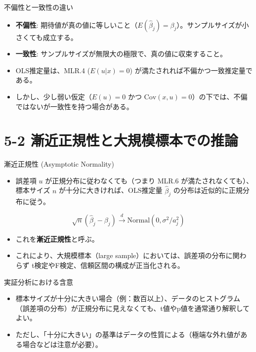 \documentclass[
  ignorenonframetext,
]{beamer}
\providecommand{\tightlist}{%
  \setlength{\itemsep}{0pt}\setlength{\parskip}{0pt}}
\begin{document}
\begin{frame}{不偏性と一致性の違い}
\protect\hypertarget{ux4e0dux504fux6027ux3068ux4e00ux81f4ux6027ux306eux9055ux3044}{}
\begin{itemize}
\tightlist
\item
  \textbf{不偏性}:
  期待値が真の値に等しいこと（\(E(\hat{\beta}_j) = \beta_j\)）。サンプルサイズが小さくても成立する。
\item
  \textbf{一致性}:
  サンプルサイズが無限大の極限で、真の値に収束すること。
\item
  OLS推定量は、MLR.4 (\(E(u|x)=0\))
  が満たされれば不偏かつ一致推定量である。
\item
  しかし、少し弱い仮定（\(E(u)=0\) かつ
  \(\text{Cov}(x,u)=0\)）の下では、不偏ではないが一致性を持つ場合がある。
\end{itemize}
\end{frame}

\hypertarget{ux6f38ux8fd1ux6b63ux898fux6027ux3068ux5927ux898fux6a21ux6a19ux672cux3067ux306eux63a8ux8ad6}{%
\section{5-2
漸近正規性と大規模標本での推論}\label{ux6f38ux8fd1ux6b63ux898fux6027ux3068ux5927ux898fux6a21ux6a19ux672cux3067ux306eux63a8ux8ad6}}

\begin{frame}{漸近正規性 (Asymptotic Normality)}
\protect\hypertarget{ux6f38ux8fd1ux6b63ux898fux6027-asymptotic-normality}{}
\begin{itemize}
\tightlist
\item
  誤差項 \(u\) が正規分布に従わなくても（つまり MLR.6
  が満たされなくても）、標本サイズ \(n\) が十分に大きければ、OLS推定量
  \(\hat{\beta}_j\) の分布は近似的に正規分布に従う。
\end{itemize}

\[ \sqrt{n}(\hat{\beta}_j - \beta_j) \xrightarrow{d} \text{Normal}(0, \sigma^2 / a_j^2) \]

\begin{itemize}
\tightlist
\item
  これを\textbf{漸近正規性}と呼ぶ。
\item
  これにより、大規模標本（large
  sample）においては、誤差項の分布に関わらず
  t検定やF検定、信頼区間の構成が正当化される。
\end{itemize}
\end{frame}

\begin{frame}{実証分析における含意}
\protect\hypertarget{ux5b9fux8a3cux5206ux6790ux306bux304aux3051ux308bux542bux610f}{}
\begin{itemize}
\tightlist
\item
  標本サイズが十分に大きい場合（例：数百以上）、データのヒストグラム（誤差項の分布）が正規分布に見えなくても、t値やp値を通常通り解釈してよい。
\item
  ただし、「十分に大きい」の基準はデータの性質による（極端な外れ値がある場合などは注意が必要）。
\end{itemize}
\end{frame}
\end{document}
